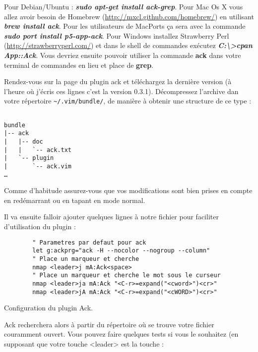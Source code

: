 Pour Debian/Ubuntu : \textbf{\emph{sudo apt-get install ack-grep}}. Pour Mac Os X vous allez avoir besoin de Homebrew (\url{http://mxcl.github.com/homebrew/}) en utilisant \textbf{\emph{brew install ack}}. Pour les utilisateurs de MacPorts ça sera avec la commande \textbf{\emph{sudo port install p5-app-ack}}. Pour Windows installez Strawberry Perl (\url{http://strawberryperl.com/}) et dans le shell de commandes exécutez \textbf{\emph{C:\textbackslash>cpan App::Ack}}. Vous devriez ensuite pouvoir utiliser la commande \textbf{ack} dans votre terminal de commandes en lieu et place de \textbf{grep}.

Rendez-vous sur la page du plugin ack et téléchargez la dernière version (à l'heure où j'écris ces lignes c'est la version 0.3.1). Décompressez l'archive dan votre répertoire \Verb|~/.vim/bundle/|, de manière à obtenir une structure de ce type :

\begin{verbatim}

bundle
|-- ack
|   |-- doc
|   |   `-- ack.txt
|   `-- plugin
|       `-- ack.vim
…
\end{verbatim}

Comme d'habitude assurez-vous que vos modifications sont bien prises en compte en redémarrant \vim ou en tapant  en mode normal.

Il va ensuite falloir ajouter quelques lignes à notre fichier \vimrc pour faciliter d'utilisation du plugin :

\begin{listing}[H]

    \begin{verbatim}
        " Parametres par defaut pour ack
        let g:ackprg="ack -H --nocolor --nogroup --column"
        " Place un marqueur et cherche
        nmap <leader>j mA:Ack<space>
        " Place un marqueur et cherche le mot sous le curseur
        nmap <leader>ja mA:Ack "<C-r>=expand("<cword>")<cr>"
        nmap <leader>jA mA:Ack "<C-r>=expand("<cWORD>")<cr>"
    \end{verbatim}
    \caption{Configuration du plugin Ack.}
    \label{code:ack}
\end{listing}

Ack recherchera alors à partir du répertoire où se trouve votre fichier couramment ouvert. Vous pouvez faire quelques tests si vous le souhaitez (en supposant que votre touche <leader> est la touche \tcomma :

